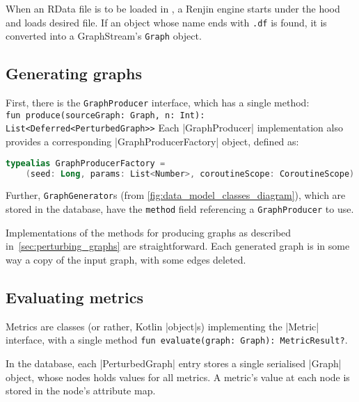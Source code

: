 When an RData file is to be loaded in \graffs, a Renjin engine starts under the hood and loads desired file.
If an object whose name ends with \texttt{.df}\footnotemark{} is found, it is converted into a GraphStream's \texttt{Graph} object.

\subsection{Generating graphs}

First, there is the \texttt{GraphProducer} interface, which has a single method\footnotemark{}:\\ \texttt{fun produce(sourceGraph: Graph, n: Int): List<Deferred<PerturbedGraph>>}
Each |GraphProducer| implementation also provides a corresponding |GraphProducerFactory| object, defined as:
\begin{lstlisting}[language=Kotlin]
typealias GraphProducerFactory =
    (seed: Long, params: List<Number>, coroutineScope: CoroutineScope) -> GraphProducer
\end{lstlisting}

Further, \texttt{GraphGenerator}s (from \autoref{fig:data_model_classes_diagram}), which are stored in the database, have the \texttt{method} field referencing a \texttt{GraphProducer} to use.

Implementations of the methods for producing graphs as described in~\autoref{sec:perturbing_graphs} are straightforward.
Each generated graph is in some way a copy of the input graph, with some edges deleted.

\subsection{Evaluating metrics}

Metrics are classes (or rather, Kotlin |object|s) implementing the |Metric| interface, with a single method \texttt{fun evaluate(graph: Graph): MetricResult?}.

In the database, each |PerturbedGraph| entry stores a single serialised |Graph| object, whose nodes holds values for all metrics.
A metric's value at each node is stored in the node's attribute map.

